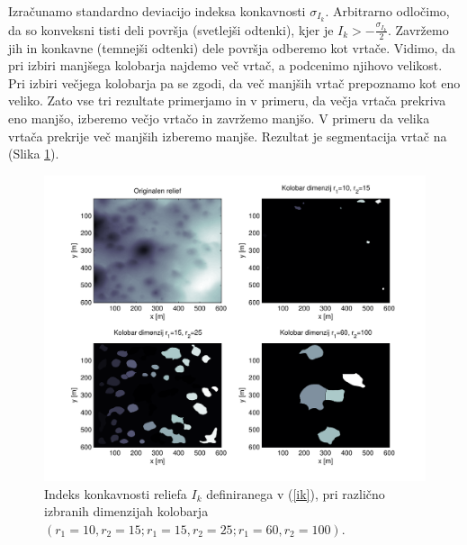 \documentclass[a4paper, twoside, 12pt]{book}
\begin{document}
Izračunamo standardno deviacijo indeksa konkavnosti $\sigma_{I_k}$. Arbitrarno odločimo, da so konveksni tisti deli površja (svetlejši odtenki), kjer je $I_k > -\frac{\sigma_{I_k}}{2}$. Zavržemo jih in konkavne (temnejši odtenki) dele površja odberemo kot vrtače. Vidimo, da pri izbiri manjšega kolobarja najdemo več vrtač, a podcenimo njihovo velikost. Pri izbiri večjega kolobarja pa se zgodi, da več manjših vrtač prepoznamo kot eno veliko. Zato vse tri rezultate primerjamo in v primeru, da večja vrtača prekriva eno manjšo, izberemo večjo vrtačo in zavržemo manjšo. V primeru da velika vrtača prekrije več manjših izberemo manjše. Rezultat je segmentacija vrtač na (Slika \ref{fig:concavity-segmentation-samples}).
  \begin{figure}[h!]
    \begin{center}
      \includegraphics[width=12cm]{slike/concavity-segmentation-samples.pdf}
    \end{center}
    \caption{Indeks konkavnosti reliefa $I_k$ definiranega v (\ref{ik}), pri različno izbranih dimenzijah kolobarja $(r_1=10,r_2=15;r_1=15,r_2=25;r_1=60,r_2=100)$.}
    \label{fig:concavity-segmentation-samples}
  \end{figure}
\end{document}
